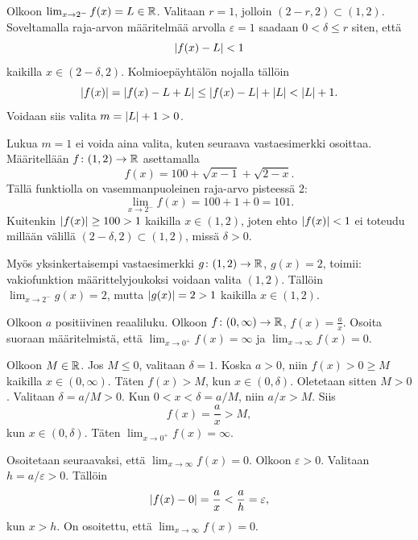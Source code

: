 \documentclass[11pt,a4paper]{amsart}
\begin{document}
\begin{solution}
  Olkoon \(\lim_{x \to 2^-} f(x) = L \in \mathbb{R}\).
  Valitaan \(r = 1\), jolloin \((2-r,2) \subset (1,2)\).
  Soveltamalla raja-arvon määritelmää arvolla \(\varepsilon = 1\)
  saadaan \(0 < \delta \leq r\) siten, että
  \[
    \lvert f(x) - L\rvert < 1
  \]
  kaikilla \(x \in (2-\delta,2)\). Kolmioepäyhtälön nojalla tällöin
  \[
    \lvert f(x)\rvert = \lvert f(x) - L + L\rvert
    \leq \lvert f(x) - L\rvert + \lvert L\rvert < \lvert L\rvert + 1.
  \]
  Voidaan siis valita \(m = \lvert L\rvert + 1 > 0\).

  Lukua \(m = 1\) ei voida aina valita, kuten seuraava vastaesimerkki
  osoittaa. Määritellään \(f\colon (1,2) \to \mathbb{R}\) asettamalla
  \[
    f(x) = 100 + \sqrt{x - 1} + \sqrt{2 - x}.
  \]
  Tällä funktiolla on vasemmanpuoleinen raja-arvo pisteessä 2:
  \[
    \lim_{x \to 2^-} f(x) = 100 + 1 + 0 = 101.
  \]
  Kuitenkin \(\lvert f(x)\rvert \geq 100 > 1\) kaikilla \(x \in (1,2)\),
  joten ehto \(\lvert f(x)\rvert < 1\) ei toteudu millään välillä
  \((2-\delta,2) \subset (1,2)\), missä \(\delta > 0\).

  Myös yksinkertaisempi vastaesimerkki \(g\colon (1,2) \to \mathbb{R}\),
  \(g(x) = 2\), toimii: vakiofunktion määrittelyjoukoksi voidaan valita
  \((1,2)\). Tällöin \(\lim_{x \to 2^-} g(x) = 2\), mutta
  \(\lvert g(x)\rvert = 2 > 1\) kaikilla \(x \in (1,2)\).
\end{solution}

\begin{exercise}
  Olkoon \(a\) positiivinen reaaliluku. Olkoon
  \(f\colon (0,\infty) \to \mathbb{R}\), \(f(x) = \frac{a}{x}\).
  Osoita suoraan määritelmistä, että \(\lim_{x \to 0^+} f(x) = \infty\)
  ja \(\lim_{x \to \infty} f(x) = 0\).
\end{exercise}

\begin{solution}
  Olkoon \(M \in \mathbb{R}\). Jos \(M \leq 0\), valitaan \(\delta = 1\).
  Koska \(a > 0\), niin \(f(x) > 0 \geq M\) kaikilla \(x \in (0, \infty)\).
  Täten \(f(x) > M\), kun \(x \in (0, \delta)\). Oletetaan sitten \(M > 0\).
  Valitaan \(\delta = a/M > 0\). Kun \(0 < x < \delta = a/M\), niin \(a/x > M\).
  Siis
  \[
    f(x) = \frac{a}{x} > M,
  \]
  kun \(x \in (0, \delta)\). Täten \(\lim_{x \to 0^+} f(x) = \infty\).

  Osoitetaan seuraavaksi, että \(\lim_{x \to \infty} f(x) = 0\). Olkoon
  \(\varepsilon > 0\). Valitaan \(h = a/\varepsilon > 0\). Tällöin
  \[
    \lvert f(x) - 0\rvert = \frac{a}{x} < \frac{a}{h} = \varepsilon,
  \]
  kun \(x > h\). On osoitettu, että \(\lim_{x \to \infty} f(x) = 0\).
\end{solution}
\end{document}
